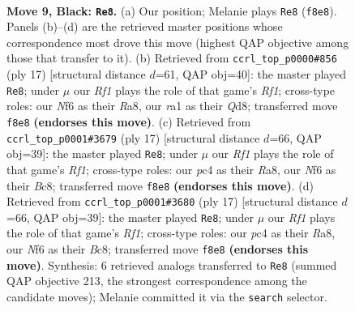 \documentclass[11pt]{article}
\begin{document}
\clearpage

\begin{figure}[p]\centering
\begin{subfigure}{0.46\textwidth}\centering
\resizebox{\linewidth}{!}{%
\newchessgame
\chessboard[
  setfen={r1b2rk1/ppppqpp1/2n1pn1p/8/P1PP3P/2P2NP1/3BPP2/R2QKB1R b KQ - 0 9},
  showmover=false,
  pgfstyle=straightmove, color=movearrow, markmove={f8-e8}
]}
\caption{}
\end{subfigure}\hfill
\begin{subfigure}{0.46\textwidth}\centering
\resizebox{\linewidth}{!}{%
\newchessgame
\chessboard[
  setfen={r1bq1rk1/1pp2ppp/2nppn2/p7/2PP4/PPQ2N2/1B2PPPP/R3KB1R b KQ - 2 9},
  showmover=false,
  pgfstyle=straightmove, color=movearrow, markmove={f8-e8}
]}
\caption{}
\end{subfigure}
\\[4pt]
\begin{subfigure}{0.46\textwidth}\centering
\resizebox{\linewidth}{!}{%
\newchessgame
\chessboard[
  setfen={r1bq1rk1/ppp2pp1/2np1n1p/4p3/4P3/P1PP1NP1/2P2PBP/R1BQ1RK1 b - - 0 9},
  showmover=false,
  pgfstyle=straightmove, color=movearrow, markmove={f8-e8}
]}
\caption{}
\end{subfigure}\hfill
\begin{subfigure}{0.46\textwidth}\centering
\resizebox{\linewidth}{!}{%
\newchessgame
\chessboard[
  setfen={r1bq1rk1/ppp2pp1/2np1n1p/4p3/4P3/P1PP1NP1/2P2PBP/R1BQ1RK1 b - - 0 9},
  showmover=false,
  pgfstyle=straightmove, color=movearrow, markmove={f8-e8}
]}
\caption{}
\end{subfigure}
\caption{\textbf{Move 9, Black: \texttt{Re8}.} (a) Our position; Melanie plays \texttt{Re8} (\texttt{f8e8}). Panels (b)--(d) are the retrieved master positions whose correspondence most drove this move (highest QAP objective among those that transfer to it). (b) Retrieved from \texttt{ccrl\_top\_p0000\#856} (ply 17) [structural distance $d$=61, QAP obj=40]: the master played \texttt{Re8}; under $\mu$ our \emph{Rf1} plays the role of that game's \emph{Rf1}; cross-type roles: our \emph{N}f6 as their \emph{R}a8, our \emph{r}a1 as their \emph{Q}d8; transferred move \texttt{f8e8} \textbf{(endorses this move)}. (c) Retrieved from \texttt{ccrl\_top\_p0001\#3679} (ply 17) [structural distance $d$=66, QAP obj=39]: the master played \texttt{Re8}; under $\mu$ our \emph{Rf1} plays the role of that game's \emph{Rf1}; cross-type roles: our \emph{p}c4 as their \emph{R}a8, our \emph{N}f6 as their \emph{B}c8; transferred move \texttt{f8e8} \textbf{(endorses this move)}. (d) Retrieved from \texttt{ccrl\_top\_p0001\#3680} (ply 17) [structural distance $d$=66, QAP obj=39]: the master played \texttt{Re8}; under $\mu$ our \emph{Rf1} plays the role of that game's \emph{Rf1}; cross-type roles: our \emph{p}c4 as their \emph{R}a8, our \emph{N}f6 as their \emph{B}c8; transferred move \texttt{f8e8} \textbf{(endorses this move)}. Synthesis: 6 retrieved analogs transferred to \texttt{Re8} (summed QAP objective 213, the strongest correspondence among the candidate moves); Melanie committed it via the \texttt{search} selector.}
\label{fig:thought-m17}
\end{figure}
\end{document}
